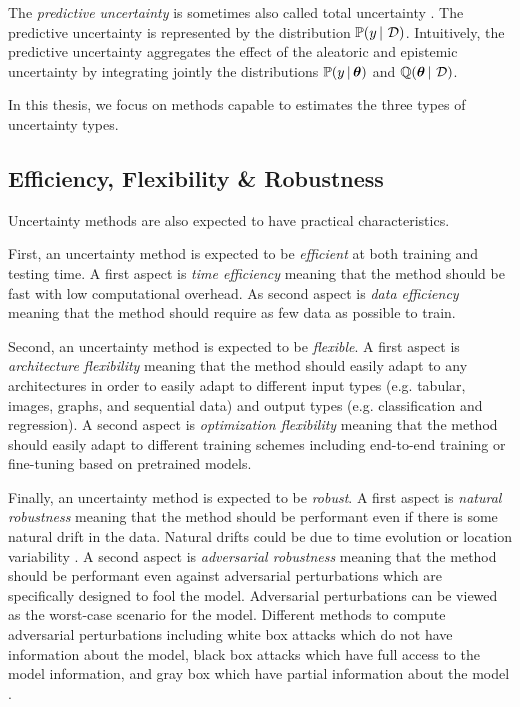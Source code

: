 The \emph{predictive uncertainty} is sometimes also called total uncertainty \cite{hullermeier2021aleatoric,malini2018}.
The predictive uncertainty is represented by the distribution $\mathbb{P}(y \,|\, \operatorname{\mathcal{D}})$.
Intuitively, the predictive uncertainty aggregates the effect of the aleatoric and epistemic uncertainty by integrating jointly the distributions $\mathbb{P}(y \,|\, \bm{\theta})$ and $\operatorname{\mathbb{Q}}(\bm{\theta} \,|\, \operatorname{\mathcal{D}})$. 

In this thesis, we focus on methods capable to estimates the three types of uncertainty types.

\subsection{Efficiency, Flexibility \& Robustness}

Uncertainty methods are also expected to have practical characteristics. 

First, an uncertainty method is expected to be \emph{efficient} at both training and testing time. 
A first aspect is \emph{time efficiency} meaning that the method should be fast with low computational overhead.
As second aspect is \emph{data efficiency} meaning that the method should require as few data as possible to train.

Second, an uncertainty method is expected to be \emph{flexible}.
A first aspect is \emph{architecture flexibility} meaning that the method should easily adapt to any architectures in order to easily adapt to different input types (e.g. tabular, images, graphs, and sequential data) and output types (e.g. classification and regression).
A second aspect is \emph{optimization flexibility} meaning that the method should easily adapt to different training schemes including end-to-end training or fine-tuning based on pretrained models.

Finally, an uncertainty method is expected to be \emph{robust}.
A first aspect is \emph{natural robustness} meaning that the method should be performant even if there is some natural drift in the data. Natural drifts could be due to time evolution or location variability \cite{wilds, neuhold201mapillary, shifts-dataset}.
A second aspect is \emph{adversarial robustness} meaning that the method should be performant even against adversarial perturbations which are specifically designed to fool the model. Adversarial perturbations can be viewed as the worst-case scenario for the model. Different methods to compute adversarial perturbations including white box attacks which do not have information about the model, black box attacks which have full access to the model information, and gray box which have partial information about the model \cite{han2020adversarial}.

